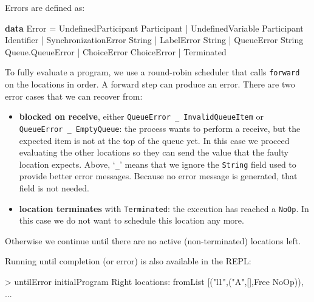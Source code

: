 \documentclass[runningheads,plain]{llncs}
\newenvironment{Shaded}{}{}
\newcommand{\KeywordTok}[1]{\textcolor[rgb]{0.00,0.44,0.13}{\textbf{#1}}}
\newcommand{\DataTypeTok}[1]{\textcolor[rgb]{0.56,0.13,0.00}{#1}}
\newcommand{\StringTok}[1]{\textcolor[rgb]{0.25,0.44,0.63}{#1}}
\newcommand{\FunctionTok}[1]{\textcolor[rgb]{0.02,0.16,0.49}{#1}}
\newcommand{\NormalTok}[1]{#1}
\begin{document}
Errors are defined as:

\begin{Shaded}
\begin{Highlighting}[]
\KeywordTok{data} \DataTypeTok{Error} 
    \FunctionTok{=} \DataTypeTok{UndefinedParticipant} \DataTypeTok{Participant}
    \FunctionTok{|} \DataTypeTok{UndefinedVariable} \DataTypeTok{Participant} \DataTypeTok{Identifier}
    \FunctionTok{|} \DataTypeTok{SynchronizationError} \DataTypeTok{String}
    \FunctionTok{|} \DataTypeTok{LabelError} \DataTypeTok{String}
    \FunctionTok{|} \DataTypeTok{QueueError} \DataTypeTok{String} \DataTypeTok{Queue.QueueError}
    \FunctionTok{|} \DataTypeTok{ChoiceError} \DataTypeTok{ChoiceError}
    \FunctionTok{|} \DataTypeTok{Terminated}
\end{Highlighting}
\end{Shaded}

To fully evaluate a program, we use a round-robin scheduler that calls
\texttt{forward} on the locations in order. A forward step can produce
an error. There are two error cases that we can recover from:

\begin{itemize}
\item
  \textbf{blocked on receive}, either
  \texttt{QueueError\ \_\ InvalidQueueItem} or
  \texttt{QueueError\ \_\ EmptyQueue}: the process wants to perform a
  receive, but the expected item is not at the top of the queue yet. In
  this case we proceed evaluating the other locations so they
  can send the value that the faulty location expects. Above, `\texttt{\_}'
    means that we ignore the \texttt{String} field
   used to provide better error messages. Because no error
  message is generated, that field is not needed.
\item
  \textbf{location terminates} with \texttt{Terminated}: the execution
  has reached a \texttt{NoOp}. In this case we do not want to schedule
  this location any more.
\end{itemize}

\noindent Otherwise we continue until there are no active (non-terminated)
locations left. 

Running until completion (or error) is also available in the REPL:

\begin{Shaded}
\begin{Highlighting}[]
\FunctionTok{>}\NormalTok{ untilError initialProgram}
\DataTypeTok{Right}\NormalTok{ locations}\FunctionTok{:}\NormalTok{ fromList [(}\StringTok{"l1"}\NormalTok{,(}\StringTok{"A"}\NormalTok{,[],}\DataTypeTok{Free} \DataTypeTok{NoOp}\NormalTok{)), }\FunctionTok{...} 
\end{Highlighting}
\end{Shaded}
\end{document}
